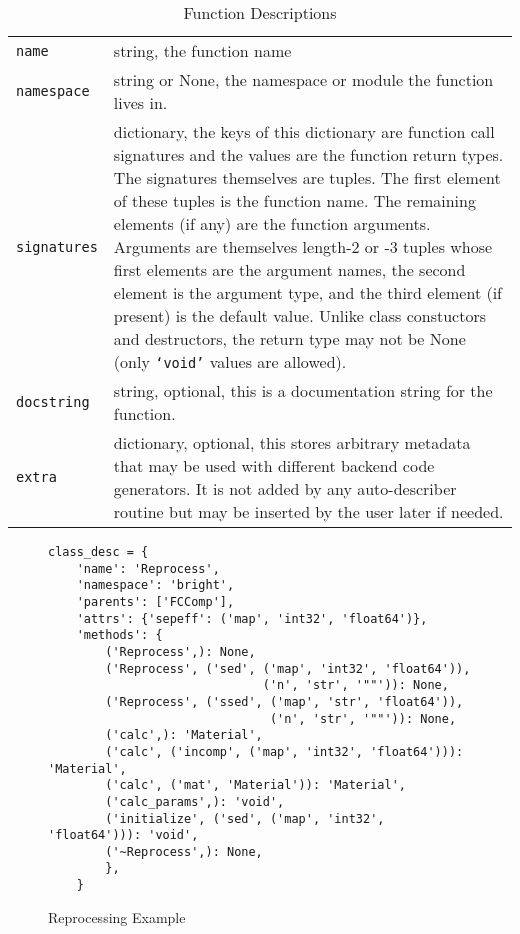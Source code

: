 \documentclass{ansconfpaper}
\newcommand{\vin}[1]{\texttt{{#1}}}
\begin{document}
\begin{table*}[htbp]
\begin{center}
\caption{Function Descriptions}
\label{funcdesc}
\begin{tabular}{|lp{0.8\hsize}|}
\hline
\vin{name} & string, the function name \\
\vin{namespace} & string or None, the namespace or module the function lives in. \\
\vin{signatures} & dictionary, the keys of this dictionary are function call 
    signatures and the values are the function return types.  The signatures
    themselves are tuples. The first element of these tuples is the function name.
    The remaining elements (if any) are the function arguments.  Arguments are 
    themselves length-2 or -3 tuples whose first elements are the argument names, 
    the second element is the argument type, and the third element (if present) is
    the default value. Unlike class constuctors and destructors, the return type 
    may not be None (only \vin{`void'} values are allowed).\\
\vin{docstring} & string, optional, this is a documentation string for the function.\\
\vin{extra} & dictionary, optional, this stores arbitrary metadata that may be used
    with different backend code generators. It is not added by any auto-describer
    routine but may be inserted by the user later if needed.\\
\hline
\end{tabular}
\end{center}
\end{table*}

\onecolumn
\begin{figure}[c]
\begin{center}
\caption{Reprocessing Example}
\label{rep_ex}
\begin{lstlisting}
class_desc = {
    'name': 'Reprocess',
    'namespace': 'bright',
    'parents': ['FCComp'],
    'attrs': {'sepeff': ('map', 'int32', 'float64')},
    'methods': {
        ('Reprocess',): None,
        ('Reprocess', ('sed', ('map', 'int32', 'float64')), 
                              ('n', 'str', '""')): None,
        ('Reprocess', ('ssed', ('map', 'str', 'float64')), 
                               ('n', 'str', '""')): None,
        ('calc',): 'Material',
        ('calc', ('incomp', ('map', 'int32', 'float64'))): 'Material',
        ('calc', ('mat', 'Material')): 'Material',
        ('calc_params',): 'void',
        ('initialize', ('sed', ('map', 'int32', 'float64'))): 'void',
        ('~Reprocess',): None,
        },
    }
\end{lstlisting}
\end{center}
\end{figure}
\twocolumn
\end{document}
